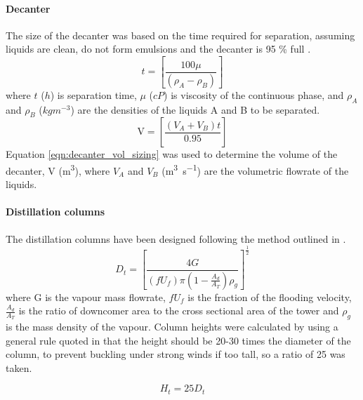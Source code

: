 \paragraph{Decanter}
The size of the decanter was based on the time required for separation, assuming liquids are clean, do not form emulsions and the decanter is 95 \% full \cite{mccabe_unit_2005}.  
\begin{equation}
    t = \left[\frac{100\mu}{(\rho_A - \rho_B)}\right]
    \label{eqn:decanter_time_sizing}
\end{equation}
where $t$ ($h$) is separation time, $\mu$ ($cP$) is viscosity of the continuous phase, and $\rho_A$ and $\rho_B$ ($kgm^{-3}$) are the densities of the liquids A and B to be separated. 
\begin{equation}
    \text{V} = \left[\frac{(V_A + V_B)t}{0.95}\right] 
    \label{eqn:decanter_vol_sizing}
\end{equation}
Equation \ref{eqn:decanter_vol_sizing} was used to determine the volume of the decanter, V (\si{\cubic\m}), where $V_A$ and $V_B$ (\si{\cubic\m\per\s})  are the volumetric flowrate of the liquids. 

\paragraph{Distillation columns}
The distillation columns have been designed following the method outlined in \textcite{seider_product_2009,seader_separation_2011}.
\begin{equation}
    D_t = \left[\frac{4G}{\left(fU_f\right)\pi\left(1-\frac{A_d}{A_T}\right)\rho_g}\right]^\frac{1}{2}
    \label{distill_dia_sizing}
\end{equation}
where G is the vapour mass flowrate, $fU_f$ is the fraction of the flooding velocity, $\frac{A_d}{A_T}$ is the ratio of downcomer area to the cross sectional area of the tower and $\rho_g$ is the mass density of the vapour. Column heights were calculated by using a general rule quoted in \textcite{douglas_conceptual_1988} that the height should be 20-30 times the diameter of the column, to prevent buckling under strong winds if too tall, so a ratio of 25 was taken. 

\begin{equation}
    H_t = 25D_t
    \label{distill_height_sizing}
\end{equation}

